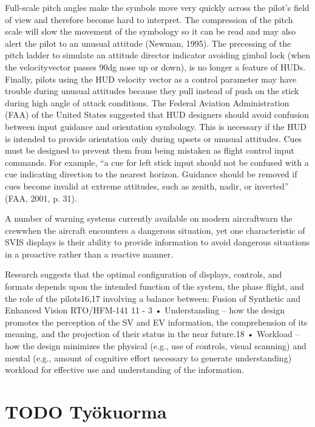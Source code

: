 \documentclass[utf8,bachelor,manualbib]{gradu3}
\begin{document}
Full-scale pitch angles make the symbols move very quickly across the pilot’s
field of view and therefore become hard to interpret. The compression of the pitch
scale will slow the movement of the symbology so it can be read and may also alert
the pilot to an unusual attitude (Newman, 1995). The precessing of the pitch ladder
to simulate an attitude director indicator avoiding gimbal lock (when the velocityvector passes 90dg nose up or down), is no longer a feature of HUDs. Finally, pilots
using the HUD velocity vector as a control parameter may have trouble during unusual
attitudes because they pull instead of push on the stick during high angle of
attack conditions.
The Federal Aviation Administration (FAA) of the United States suggested that
HUD designers should avoid confusion between input guidance and orientation
symbology. This is necessary if the HUD is intended to provide orientation only
during upsets or unusual attitudes. Cues must be designed to prevent them from
being mistaken as flight control input commands. For example, “a cue for left stick
input should not be confused with a cue indicating direction to the nearest horizon.
Guidance should be removed if cues become invalid at extreme attitudes, such as
zenith, nadir, or inverted” (FAA, 2001, p. 31).\citep{crawfordneal2006}


A number of
warning systems currently available on modern aircraftwarn the crewwhen the aircraft
encounters a dangerous situation, yet one characteristic of SVIS displays is
their ability to provide information to avoid dangerous situations in a proactive
rather than a reactive manner. \citep{schnell2004}




Research suggests that the optimal configuration of displays, controls, and formats depends upon the intended
function of the system, the phase flight, and the role of the pilots16,17 involving a balance between:
Fusion of Synthetic and Enhanced Vision
RTO/HFM-141 11 - 3
• Understanding – how the design promotes the perception of the SV and EV information, the
comprehension of its meaning, and the projection of their status in the near future.18
• Workload – how the design minimizes the physical (e.g., use of controls, visual scanning) and mental
(e.g., amount of cognitive effort necessary to generate understanding) workload for effective use and
understanding of the information.  \citep{baileyym2007}

\section{TODO Työkuorma}
\end{document}
